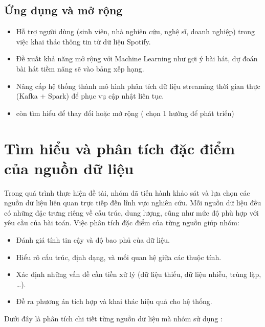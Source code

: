 \documentclass{../hcmut-report}
\begin{document}
\subsection{Ứng dụng và mở rộng}
\begin{itemize}
    \item Hỗ trợ người dùng (sinh viên, nhà nghiên cứu, nghệ sĩ, doanh nghiệp) trong việc khai thác thông tin từ dữ liệu Spotify.
    \item Đề xuất khả năng mở rộng với Machine Learning như gợi ý bài hát, dự đoán bài hát tiềm năng sẽ vào bảng xếp hạng.
    \item Nâng cấp hệ thống thành mô hình phân tích dữ liệu streaming thời gian thực (Kafka + Spark) để phục vụ cập nhật liên tục.
    \item còn tìm hiểu để thay đổi hoặc mở rộng ( chọn 1 hướng để phát triển)
\end{itemize}






\section{Tìm hiểu và phân tích đặc điểm của nguồn dữ liệu}
Trong quá trình thực hiện đề tài, nhóm đã tiến hành khảo sát và lựa chọn các nguồn dữ liệu 
liên quan trực tiếp đến lĩnh vực nghiên cứu. 
Mỗi nguồn dữ liệu đều có những đặc trưng riêng về cấu trúc, dung lượng, cũng như mức độ phù hợp 
với yêu cầu của bài toán. 
Việc phân tích đặc điểm của từng nguồn giúp nhóm:
\begin{itemize}
    \item Đánh giá tính tin cậy và độ bao phủ của dữ liệu.
    \item Hiểu rõ cấu trúc, định dạng, và mối quan hệ giữa các thuộc tính.
    \item Xác định những vấn đề cần tiền xử lý (dữ liệu thiếu, dữ liệu nhiễu, trùng lặp, …).
    \item Đề ra phương án tích hợp và khai thác hiệu quả cho hệ thống.
\end{itemize}

\large{Dưới đây là phân tích chi tiết từng nguồn dữ liệu mà nhóm sử dụng :}

% 


\end{document}
